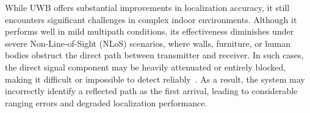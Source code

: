 While UWB offers substantial improvements in localization accuracy, it still encounters significant challenges in complex indoor environments. Although it performs well in mild multipath conditions, its effectiveness diminishes under severe Non-Line-of-Sight (NLoS) scenarios, where walls, furniture, or human bodies obstruct the direct path between transmitter and receiver. In such cases, the direct signal component may be heavily attenuated or entirely blocked, making it difficult or impossible to detect reliably~\cite{Tran2022UWB, pei2024fcn}. As a result, the system may incorrectly identify a reflected path as the first arrival, leading to considerable ranging errors and degraded localization performance.
